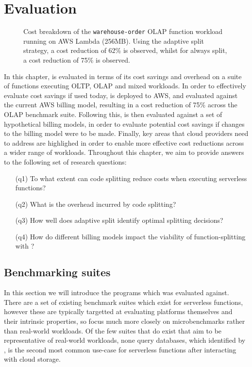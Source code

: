 \chapter{Evaluation}
\label{sec:evaluation}
\begin{figure}
    \begin{center}
        
    \end{center}
    \caption{Cost breakdown of the \texttt{warehouse-order} OLAP function workload running on AWS Lambda (256MB). Using the adaptive split strategy, a cost reduction of 62\% is observed, whilst for always split, a cost reduction of 75\% is observed.}
\end{figure}

In this chapter, \faaas{} is evaluated in terms of its cost savings and overhead on a suite of \faas{} functions executing OLTP, OLAP and mixed workloads. In order to effectively evaluate cost savings if used today, \faas{} is deployed to AWS, and evaluated against the current AWS billing model, resulting in a cost reduction of 75\% across the OLAP benchmark suite. Following this, \faaas{} is then evaluated against a set of hypothetical billing models, in order to evaluate potential cost savings if changes to the billing model were to be made. Finally, key areas that cloud providers need to address are highlighed in order to enable more effective cost reductions across a wider range of \faas{} workloads. Throughout this chapter, we aim to provide answers to the following set of research questions:

\begin{itemize}
    \item[(q1)] To what extent can code splitting reduce costs when executing serverless functions?
    \item[(q2)] What is the overhead incurred by code splitting?
    \item[(q3)] How well does adaptive split identify optimal splitting decisions?
    \item[(q4)] How do different \faas{} billing models impact the viability of function-splitting with \faaas{}?
\end{itemize}

\section{Benchmarking suites}
In this section we will introduce the programs which \faaas{} was evaluated against. There are a set of existing benchmark suites which exist for serverless functions, however these are typically targetted at evaluating \faas{} platforms themselves and their intrinsic properties, so focus much more closely on microbenchmarks rather than real-world workloads. Of the few suites that do exist that aim to be representative of real-world workloads, none query databases, which identified by \cite{eismannReviewServerlessUse2020}, is the second most common use-case for serverless functions after interacting with cloud storage.

